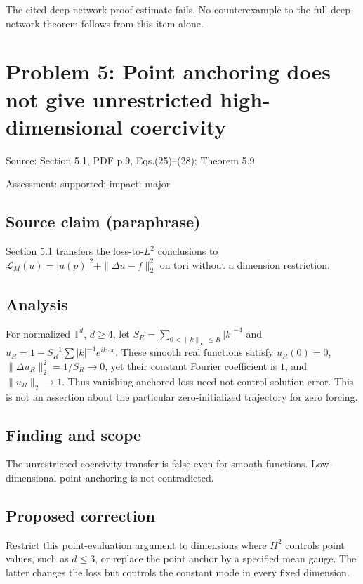 \documentclass[11pt]{article}
\begin{document}
The cited deep-network proof estimate fails. No counterexample to the full deep-network theorem follows from this item alone.

\section*{Problem 5: Point anchoring does not give unrestricted high-dimensional coercivity}

Source: Section 5.1, PDF p.9, Eqs.(25)–(28); Theorem 5.9

Assessment: supported; impact: major

\subsection*{Source claim (paraphrase)}

Section 5.1 transfers the loss-to-\(L^2\) conclusions to \(\mathcal L_M(u)=|u(p)|^2+\|\Delta u-f\|_2^2\) on tori without a dimension restriction.

\subsection*{Analysis}

For normalized \(\mathbb T^d\), \(d\geq4\), let \(S_R=\sum_{0<\|k\|_\infty\leq R}|k|^{-4}\) and \(u_R=1-S_R^{-1}\sum|k|^{-4}e^{ik\cdot x}\). These smooth real functions satisfy \(u_R(0)=0\), \(\|\Delta u_R\|_2^2=1/S_R\to0\), yet their constant Fourier coefficient is \(1\), and \(\|u_R\|_2\to1\). Thus vanishing anchored loss need not control solution error. This is not an assertion about the particular zero-initialized trajectory for zero forcing.

\subsection*{Finding and scope}

The unrestricted coercivity transfer is false even for smooth functions. Low-dimensional point anchoring is not contradicted.

\subsection*{Proposed correction}

Restrict this point-evaluation argument to dimensions where \(H^2\) controls point values, such as \(d\leq3\), or replace the point anchor by a specified mean gauge. The latter changes the loss but controls the constant mode in every fixed dimension.
\end{document}
